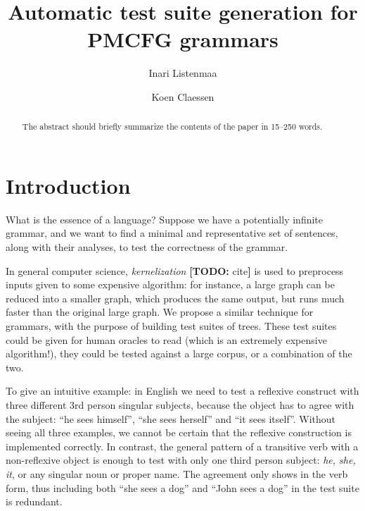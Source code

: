\documentclass[runningheads]{llncs}
\newcommand{\todo}[1]{{\color{cyan}\textbf{[TODO: }#1\textbf{]}}}
\begin{document}
%
\title{Automatic test suite generation for PMCFG grammars}
%
%
\author{Inari Listenmaa \and
Koen Claessen}
%
%
%
\maketitle              %
%
\begin{abstract}
The abstract should briefly summarize the contents of the paper in
15--250 words.

\end{abstract}
%
%
%
\section{Introduction}

What is the essence of a language? 
Suppose we have a potentially infinite grammar, and we want to find a
minimal and representative set of sentences, along with their
analyses, to test the correctness of the grammar.

In general computer science, \emph{kernelization} \todo{cite} is used
to preprocess inputs given to some expensive algorithm: for instance,
a large graph can be reduced into a smaller graph, which produces the
same output, but runs much faster than the original large graph. We
propose a similar technique for grammars, with the purpose of building
test suites of trees. These test suites could be given for human
oracles to read (which is an extremely expensive algorithm!), they
could be tested against a large corpus, or a combination of the two. 

To give an intuitive example: in English we need to test a reflexive
construct with three different 3rd person singular subjects, because
the object has to agree with the subject: ``he sees himself'', ``she
sees herself'' and ``it sees itself''. Without seeing all three
examples, we cannot be certain that the reflexive construction is
implemented correctly. In contrast, the general pattern of a transitive
verb with a non-reflexive object is enough to test with only one third
person subject: \emph{he, she, it}, or any singular noun or proper
name. The agreement only shows in the verb form, thus including both
``she sees a dog'' and ``John sees a dog'' in the test suite is redundant. 
\end{document}
